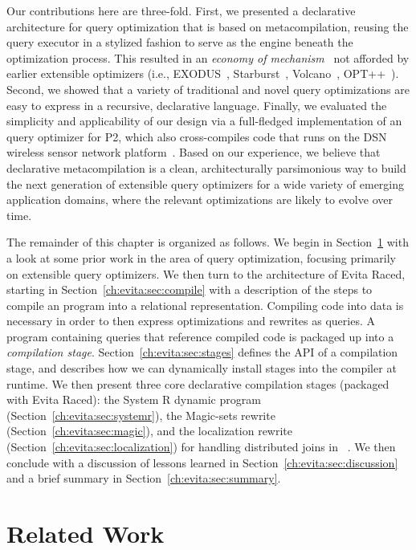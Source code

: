 Our contributions here are three-fold.  First, we presented a declarative
architecture for query optimization that is based on metacompilation, reusing
the query executor in a stylized fashion to serve as the engine beneath the
optimization process.  This resulted in an {\em economy of
mechanism}~\cite{Saltzer75theprotection} not afforded by earlier extensible
optimizers (i.e., EXODUS~\cite{exodus}, Starburst~\cite{phh92},
Volcano~\cite{volcano}, OPT++~\cite{opt++}).  Second, we showed that a variety
of traditional and novel query optimizations are easy to express in a
recursive, declarative language.  Finally, we evaluated the simplicity and
applicability of our design via a full-fledged implementation of an \OVERLOG
query optimizer for P2, which also cross-compiles code that runs on the DSN
wireless sensor network platform~\cite{chu-sensys07}.  Based on our experience,
we believe that declarative metacompilation is a clean, architecturally
parsimonious way to build the next generation of extensible query optimizers
for a wide variety of emerging application domains, where the relevant
optimizations are likely to evolve over time.

The remainder of this chapter is organized as follows.  We begin in
Section~\ref{ch:evita:sec:related} with a look at some prior work in the area
of query optimization, focusing primarily on extensible query optimizers.  We
then turn to the architecture of Evita Raced, starting in
Section~\ref{ch:evita:sec:compile} with a description of the steps to compile
an \OVERLOG program into a relational representation.  Compiling code into data
is necessary in order to then express optimizations and rewrites as queries.  A
program containing queries that reference compiled code is packaged up into a
{\em compilation stage}.  Section~\ref{ch:evita:sec:stages} defines the API of
a compilation stage, and describes how we can dynamically install stages into
the compiler at runtime.  We then present three core declarative compilation
stages (packaged with Evita Raced): the System R dynamic program
(Section~\ref{ch:evita:sec:systemr}), the Magic-sets rewrite
(Section~\ref{ch:evita:sec:magic}), and the localization rewrite
(Section~\ref{ch:evita:sec:localization}) for handling distributed joins in
\OVERLOG~\cite{loo-sigmod06}.  We then conclude with a discussion of lessons
learned in Section~\ref{ch:evita:sec:discussion} and a brief summary in
Section~\ref{ch:evita:sec:summary}.


\section{Related Work}
\label{ch:evita:sec:related}


